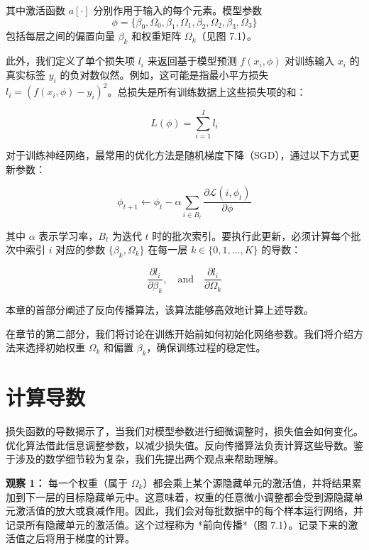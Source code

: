 \documentclass[lang=cn,newtx,10pt,scheme=chinese]{elegantbook}
\begin{document}
其中激活函数 \(a[\cdot]\) 分别作用于输入的每个元素。模型参数 
\begin{equation*}
\phi = \{\beta_0,\Omega_0,\beta_1,\Omega_1,\beta_2,\Omega_2,\beta_3,\Omega_3\}    
\end{equation*}
包括每层之间的偏置向量 \(\beta_k\) 和权重矩阵 \(\Omega_k\)（见图 7.1）。

此外，我们定义了单个损失项 \(l_i\) 来返回基于模型预测 \(f(x_i, \phi)\) 对训练输入 \(x_i\) 的真实标签 \(y_i\) 的负对数似然。例如，这可能是指最小平方损失 \(l_i = (f(x_i, \phi) - y_i)^2\)。总损失是所有训练数据上这些损失项的和：

\begin{equation}
L(\phi) = \sum_{i=1}^{I} l_i 
\end{equation}

对于训练神经网络，最常用的优化方法是随机梯度下降（SGD），通过以下方式更新参数：

\begin{equation}
\phi_{t+1} \leftarrow \phi_t - \alpha \sum_{i \in B_t} \frac{\partial \mathcal{L}(i,\phi_t)}{\partial \phi} 
\end{equation}

其中 \(\alpha\) 表示学习率，\(B_t\) 为迭代 \(t\) 时的批次索引。要执行此更新，必须计算每个批次中索引 \(i\) 对应的参数 \(\{\beta_k, \Omega_k\}\) 在每一层 \(k \in \{0, 1, \ldots, K\}\) 的导数：

\begin{equation}
\frac{\partial l_i}{\partial \beta_k}, \quad \text{and} \quad \frac{\partial l_i}{\partial \Omega_k} 
\end{equation}

本章的首部分阐述了反向传播算法，该算法能够高效地计算上述导数。

在章节的第二部分，我们将讨论在训练开始前如何初始化网络参数。我们将介绍方法来选择初始权重 \(\Omega_k\) 和偏置 \(\beta_k\)，确保训练过程的稳定性。
\section{计算导数}

损失函数的导数揭示了，当我们对模型参数进行细微调整时，损失值会如何变化。优化算法借此信息调整参数，以减少损失值。反向传播算法负责计算这些导数。鉴于涉及的数学细节较为复杂，我们先提出两个观点来帮助理解。

\textbf{观察 1：} 每一个权重（属于 \(\Omega_k\)）都会乘上某个源隐藏单元的激活值，并将结果累加到下一层的目标隐藏单元中。这意味着，权重的任意微小调整都会受到源隐藏单元激活值的放大或衰减作用。因此，我们会对每批数据中的每个样本运行网络，并记录所有隐藏单元的激活值。这个过程称为 *前向传播*（图 7.1）。记录下来的激活值之后将用于梯度的计算。
\end{document}
